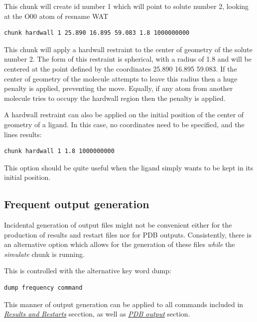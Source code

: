 \documentclass[letterpaper,10pt,english]{sphinxmanual}
\begin{document}
This chunk will create id number 1 which will point to solute number 2, looking at the O00 atom of resname WAT

\begin{Verbatim}[commandchars=\\\{\}]
chunk hardwall 1 25.890 16.895 59.083 1.8 1000000000
\end{Verbatim}

This chunk will apply a hardwall restraint to the center of geometry of the solute number 2. The form of this restraint is spherical, with a radius of 1.8 and will be centered at the point defined by the coordinates 25.890 16.895 59.083. If the center of geometry of the molecule attempts to leave this radius then a huge penalty is applied, preventing the move. Equally, if any atom from another molecule tries to occupy the hardwall region then the penalty is applied.

A hardwall restraint can also be applied on the initial position of the center of geometry of a ligand. In this case, no coordinates need to be specified, and the lines results:

\begin{Verbatim}[commandchars=\\\{\}]
chunk hardwall 1 1.8 1000000000
\end{Verbatim}

This option should be quite useful when the ligand simply wants to be kept in its initial position.


\subsection{Frequent output generation}
\label{protoms:frequent-output-generation}
Incidental generation of output files might not be convenient either for the production of results and restart files nor for PDB outputs. Consistently, there is an alternative option which allows for the generation of these files \emph{while} the \emph{simulate} chunk is running.

This is controlled with the alternative key word dump:

\begin{Verbatim}[commandchars=\\\{\}]
dump frequency command
\end{Verbatim}

This manner of output generation can be applied to all commands included in {\hyperref[protoms:results-and-restarts]{\emph{Results and Restarts}}} secction, as well as {\hyperref[protoms:pdb-output]{\emph{PDB output}}} section.
\end{document}
